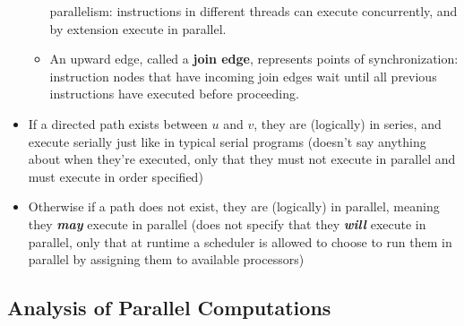 \documentclass[bsc,frontabs,singlespacing,parskip,deptreport,normalheadings]{infthesis}
\begin{document}
\begin{itemize}
\begin{itemize}
            parallelism: instructions in different threads can execute
            concurrently, and by extension execute in parallel.
        \item An upward edge, called a \textbf{join edge}, represents points of
            synchronization: instruction nodes that have incoming join edges
            wait until all previous instructions have executed before
            proceeding.
    \end{itemize}
    \item If a directed path exists between \(u\) and \(v\), they are
        (logically) in series, and execute serially just like in typical
        serial programs (doesn't say anything about when they're executed,
        only that they must not execute in parallel and must execute in
        order specified)
    \item Otherwise if a path does not exist, they are (logically) in
        parallel, meaning they \textit{\textbf{may}} execute in parallel (does not specify
        that they \textit{\textbf{will}} execute in parallel, only that at runtime a
        scheduler is allowed to choose to run them in parallel by assigning
        them to available processors)
\end{itemize}

\subsection{Analysis of Parallel Computations}
\end{document}

